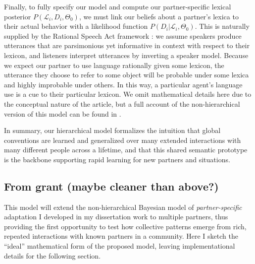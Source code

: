 Finally, to fully specify our model and compute our partner-specific lexical posterior $P(\mathcal{L}_i, D_i, \Theta_0)$, we must link our beliefs about a partner's lexica to their actual behavior with a likelihood function $P(D_i | \mathcal{L}_i, \Theta_0)$. This is naturally supplied by the Rational Speech Act framework \cite{FrankGoodman12_PragmaticReasoningLanguageGames,GoodmanFrank16_RSATiCS,BergenLevyGoodman16_LexicalUncertainty,SmithGoodmanFrank13_RecursivePragmaticReasoningNIPS}: we assume speakers produce utterances that are parsimonious yet informative in context with respect to their lexicon, and listeners interpret utterances by inverting a speaker model. Because we expect our partner to use language rationally given some lexicon, the utterance they choose to refer to some object will be probable under some lexica and highly improbable under others. In this way, a particular agent's language use is a cue to their particular lexicon. We omit mathematical details here due to the conceptual nature of the article, but a full account of the non-hierarchical version of this model can be found in .

In summary, our hierarchical model formalizes the intuition that global conventions are learned and generalized over many extended interactions with many different people across a lifetime, and that this shared semantic prototype is the backbone supporting rapid learning for new partners and situations. 


\subsection{From grant (maybe cleaner than above?)}
This model will extend the non-hierarchical Bayesian model of \emph{partner-specific} adaptation I developed in my dissertation work  to multiple partners, thus providing the first opportunity to test how collective patterns emerge from rich, repeated interactions with known partners in a community. 
Here I sketch the ``ideal'' mathematical form of the proposed model, leaving implementational details for the following section.

